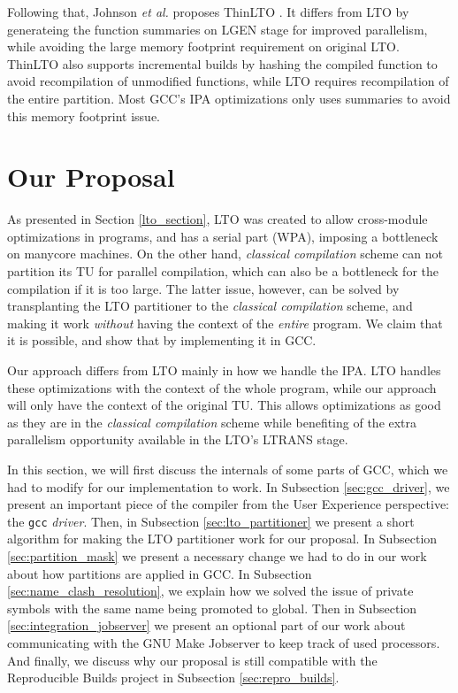 \documentclass[runningheads]{llncs}
\begin{document}
Following that, Johnson \textit{et al.} proposes ThinLTO \cite{thinlto}. It
differs from LTO by generateing the function summaries on LGEN stage for
improved parallelism, while avoiding the large memory footprint requirement on
original LTO. ThinLTO also supports incremental builds by hashing the compiled
function to avoid recompilation of unmodified functions, while LTO requires
recompilation of the entire partition. Most GCC's IPA
optimizations only uses summaries to avoid this memory footprint issue.


\section{Our Proposal} \label{sec:work}

As presented in Section \ref{lto_section}, LTO was created to allow
cross-module optimizations in programs, and has a serial part (WPA), imposing a
bottleneck on manycore machines. On the other hand, \emph{classical compilation}
scheme can not partition its TU for parallel
compilation, which can also be a bottleneck for the compilation if it is too large.
The latter issue, however, can be solved by transplanting the LTO partitioner
to the \emph{classical compilation} scheme, and making it work \textit{without}
having the context of the \textit{entire} program. We claim that it is possible,
and show that by implementing it in GCC.

Our approach differs from LTO mainly in how we handle the IPA.
LTO handles these optimizations with the context of the whole program, while
our approach will only have the context of the original TU.
This allows optimizations as good as they are in the \emph{classical
compilation} scheme while benefiting of the extra parallelism opportunity
available in the LTO's LTRANS stage.

In this section, we will first discuss the internals of some parts of GCC,
which we had to modify for our implementation to work. In Subsection
\ref{sec:gcc_driver}, we present an important piece of the compiler from the
User Experience perspective: the \texttt{gcc} \textit{driver}. Then, in
Subsection \ref{sec:lto_partitioner} we present a short algorithm for making
the LTO partitioner work for our proposal. In Subsection
\ref{sec:partition_mask} we present a necessary change we had to do in our work
about how partitions are applied in GCC. In
Subsection \ref{sec:name_clash_resolution}, we explain how we solved the issue
of private symbols with the same name being promoted to global.
Then in Subsection \ref{sec:integration_jobserver} we present an optional part
of our work about communicating with the GNU Make Jobserver to keep track of
used processors. And finally, we discuss why our proposal is still compatible
with the Reproducible Builds project in Subsection \ref{sec:repro_builds}.
\end{document}
